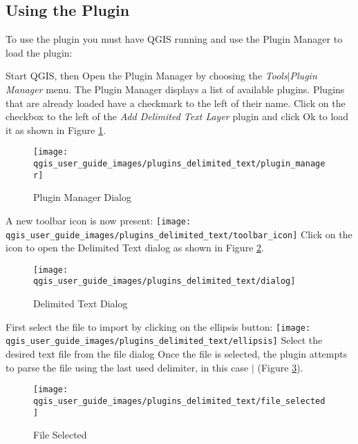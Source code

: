 \subsection{Using the Plugin}
To use the plugin you must have QGIS running and use the Plugin Manager to load the plugin:

Start QGIS, then Open the Plugin Manager by choosing the {\em Tools\mbox{$|$}Plugin Manager} menu. The Plugin Manager displays a list of available plugins. Plugins that are already loaded have a checkmark to the left of their name. Click on the checkbox to the left of the {\em Add Delimited Text Layer} plugin and click Ok to load it as shown in Figure \ref{fig:plugin_manager}.

\begin{figure}[h]
   \begin{center}
   \caption{Plugin Manager Dialog}
   \label{fig:plugin_manager}
   \smallskip
   \texttt{[image: qgis\_user\_guide\_images/plugins\_delimited\_text/plugin\_manager]}
   \end{center}  
\end{figure}


A new toolbar icon is now present:
\texttt{[image: qgis\_user\_guide\_images/plugins\_delimited\_text/toolbar\_icon]}
Click on the icon to open the Delimited Text dialog as shown in Figure \ref{fig:delim_text_plugin_dialog}.

\begin{figure}[h]
   \begin{center}
   \caption{Delimited Text Dialog}\label{fig:delim_text_plugin_dialog}\smallskip
   \texttt{[image: qgis\_user\_guide\_images/plugins\_delimited\_text/dialog]}            
   \end{center}  
\end{figure}

  
First select the file to import by clicking on the ellipsis button: 
\texttt{[image: qgis\_user\_guide\_images/plugins\_delimited\_text/ellipsis]}
Select the desired text file from the file dialog
Once the file is selected, the plugin attempts to parse the file using the last
used delimiter, in this case \mbox{$|$} (Figure
\ref{fig:delim_text_file_selected}).
\begin{figure}[h]
   \begin{center}
   \caption{File Selected}\label{fig:delim_text_file_selected}\smallskip
   \texttt{[image: qgis\_user\_guide\_images/plugins\_delimited\_text/file\_selected]}   
   \end{center}  
\end{figure}

